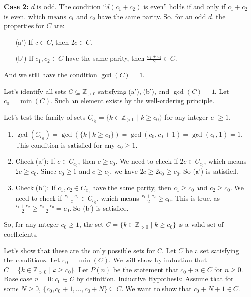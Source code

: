 \documentclass[12pt,a4paper]{article}
\theoremstyle{definition}
\begin{document}
    \textbf{Case 2:} $d$ is odd.
    The condition ``$d(c_1+c_2)$ is even'' holds if and only if $c_1+c_2$ is even, which means $c_1$ and $c_2$ have the same parity.
    So, for an odd $d$, the properties for $C$ are:
    \begin{enumerate}
        \item[(a')] If $c \in C$, then $2c \in C$.
        \item[(b')] If $c_1, c_2 \in C$ have the same parity, then $\frac{c_1+c_2}{2} \in C$.
    \end{enumerate}
    And we still have the condition $\gcd(C)=1$.

    Let's identify all sets $C \subseteq \mathbb{Z}_{>0}$ satisfying (a'), (b'), and $\gcd(C)=1$.
    Let $c_0 = \min(C)$. Such an element exists by the well-ordering principle.

    Let's test the family of sets $C_{c_0} = \{k \in \mathbb{Z}_{>0} \mid k \geq c_0\}$ for any integer $c_0 \geq 1$.
    \begin{enumerate}
        \item $\gcd(C_{c_0}) = \gcd(\{k \mid k \geq c_0\}) = \gcd(c_0, c_0+1) = \gcd(c_0, 1) = 1$. This condition is satisfied for any $c_0 \geq 1$.
        \item Check (a'): If $c \in C_{c_0}$, then $c \geq c_0$. We need to check if $2c \in C_{c_0}$, which means $2c \geq c_0$. Since $c_0 \geq 1$ and $c \geq c_0$, we have $2c \geq 2c_0 \geq c_0$. So (a') is satisfied.
        \item Check (b'): If $c_1, c_2 \in C_{c_0}$ have the same parity, then $c_1 \geq c_0$ and $c_2 \geq c_0$. We need to check if $\frac{c_1+c_2}{2} \in C_{c_0}$, which means $\frac{c_1+c_2}{2} \geq c_0$. This is true, as $\frac{c_1+c_2}{2} \geq \frac{c_0+c_0}{2} = c_0$. So (b') is satisfied.
    \end{enumerate}

    So, for any integer $c_0 \geq 1$, the set $C = \{k \in \mathbb{Z}_{>0} \mid k \geq c_0\}$ is a valid set of coefficients.

    Let's show that these are the only possible sets for $C$.
    Let $C$ be a set satisfying the conditions. Let $c_0 = \min(C)$. We will show by induction that $C = \{k \in \mathbb{Z}_{>0} \mid k \geq c_0\}$.
    Let $P(n)$ be the statement that $c_0+n \in C$ for $n \geq 0$.
    Base case $n=0$: $c_0 \in C$ by definition.
    Inductive Hypothesis: Assume that for some $N \geq 0$, $\{c_0, c_0+1, \ldots, c_0+N\} \subseteq C$.
    We want to show that $c_0+N+1 \in C$.
\end{document}
